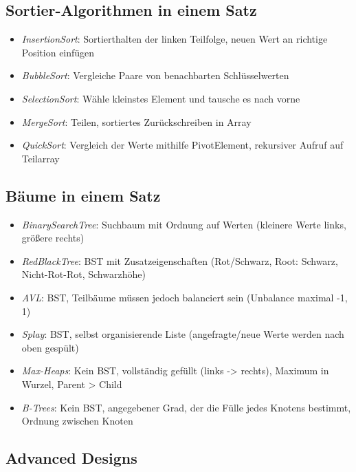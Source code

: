     \subsection{Sortier-Algorithmen in einem Satz}
        \begin{itemize}
            \item \textit{InsertionSort}: Sortierthalten der linken Teilfolge, neuen Wert an richtige Position einfügen
            \item \textit{BubbleSort}: Vergleiche Paare von benachbarten Schlüsselwerten
            \item \textit{SelectionSort}: Wähle kleinstes Element und tausche es nach vorne
            \item \textit{MergeSort}: Teilen, sortiertes Zurückschreiben in Array
            \item \textit{QuickSort}: Vergleich der Werte mithilfe PivotElement, rekursiver Aufruf auf Teilarray
        \end{itemize}

    \subsection{Bäume in einem Satz}
        \begin{itemize}
            \item \textit{BinarySearchTree}: Suchbaum mit Ordnung auf Werten (kleinere Werte links, größere rechts)
            \item \textit{RedBlackTree}: BST mit Zusatzeigenschaften (Rot/Schwarz, Root: Schwarz, Nicht-Rot-Rot, Schwarzhöhe)
            \item \textit{AVL}: BST, Teilbäume müssen jedoch balanciert sein (Unbalance maximal -1, 1)
            \item \textit{Splay}: BST, selbst organisierende Liste (angefragte/neue Werte werden nach oben gespült)
            \item \textit{Max-Heaps}: Kein BST, vollständig gefüllt (links -> rechts), Maximum in Wurzel, Parent > Child
            \item \textit{B-Trees}: Kein BST, angegebener Grad, der die Fülle jedes Knotens bestimmt, Ordnung zwischen Knoten
        \end{itemize}

    \subsection{Advanced Designs}
